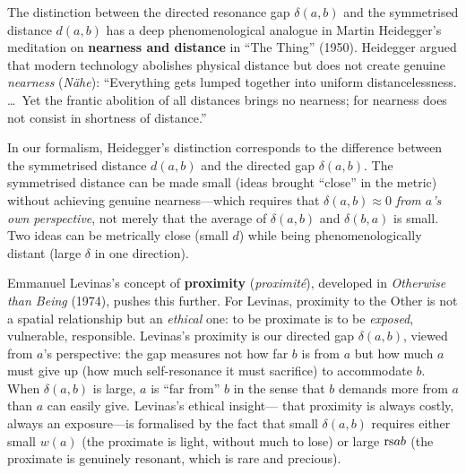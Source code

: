 \begin{interpretation}
\label{interp:ch11:heidegger_nearness}
The distinction between the directed resonance gap $\delta(a,b)$ and the
symmetrised distance $d(a,b)$ has a deep phenomenological analogue in Martin
Heidegger's meditation on \textbf{nearness and distance} in ``The Thing''
(1950).  Heidegger argued that modern technology abolishes physical distance
but does not create genuine \emph{nearness} (\emph{N\"ahe}): ``Everything
gets lumped together into uniform distancelessness. \ldots\ Yet the frantic
abolition of all distances brings no nearness; for nearness does not consist
in shortness of distance.''

In our formalism, Heidegger's distinction corresponds to the difference
between the symmetrised distance $d(a,b)$ and the directed gap $\delta(a,b)$.
The symmetrised distance can be made small (ideas brought ``close'' in the
metric) without achieving genuine nearness---which requires that $\delta(a,b)
\approx 0$ \emph{from $a$'s own perspective}, not merely that the average
of $\delta(a,b)$ and $\delta(b,a)$ is small.  Two ideas can be metrically
close (small $d$) while being phenomenologically distant (large $\delta$ in
one direction).

Emmanuel Levinas's concept of \textbf{proximity} (\emph{proximit\'e}), developed
in \emph{Otherwise than Being} (1974), pushes this further.  For Levinas,
proximity to the Other is not a spatial relationship but an \emph{ethical}
one: to be proximate is to be \emph{exposed}, vulnerable, responsible.
Levinas's proximity is our directed gap $\delta(a,b)$, viewed from $a$'s
perspective: the gap measures not how far $b$ is from $a$ but how much $a$
must give up (how much self-resonance it must sacrifice) to accommodate $b$.
When $\delta(a,b)$ is large, $a$ is ``far from'' $b$ in the sense that $b$
demands more from $a$ than $a$ can easily give.  Levinas's ethical insight---
that proximity is always costly, always an exposure---is formalised by the
fact that small $\delta(a,b)$ requires either small $w(a)$ (the proximate is
light, without much to lose) or large $\mathrm{rs}{a}{b}$ (the proximate is
genuinely resonant, which is rare and precious).
\end{interpretation}



